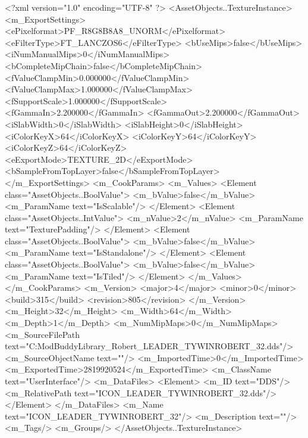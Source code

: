 <?xml version="1.0" encoding="UTF-8" ?>
<AssetObjects..TextureInstance>
	<m_ExportSettings>
		<ePixelformat>PF_R8G8B8A8_UNORM</ePixelformat>
		<eFilterType>FT_LANCZOS6</eFilterType>
		<bUseMips>false</bUseMips>
		<iNumManualMips>0</iNumManualMips>
		<bCompleteMipChain>false</bCompleteMipChain>
		<fValueClampMin>0.000000</fValueClampMin>
		<fValueClampMax>1.000000</fValueClampMax>
		<fSupportScale>1.000000</fSupportScale>
		<fGammaIn>2.200000</fGammaIn>
		<fGammaOut>2.200000</fGammaOut>
		<iSlabWidth>0</iSlabWidth>
		<iSlabHeight>0</iSlabHeight>
		<iColorKeyX>64</iColorKeyX>
		<iColorKeyY>64</iColorKeyY>
		<iColorKeyZ>64</iColorKeyZ>
		<eExportMode>TEXTURE_2D</eExportMode>
		<bSampleFromTopLayer>false</bSampleFromTopLayer>
	</m_ExportSettings>
	<m_CookParams>
		<m_Values>
			<Element class="AssetObjects..BoolValue">
				<m_bValue>false</m_bValue>
				<m_ParamName text="IsScalable"/>
			</Element>
			<Element class="AssetObjects..IntValue">
				<m_nValue>2</m_nValue>
				<m_ParamName text="TexturePadding"/>
			</Element>
			<Element class="AssetObjects..BoolValue">
				<m_bValue>false</m_bValue>
				<m_ParamName text="IsStandalone"/>
			</Element>
			<Element class="AssetObjects..BoolValue">
				<m_bValue>false</m_bValue>
				<m_ParamName text="IsTiled"/>
			</Element>
		</m_Values>
	</m_CookParams>
	<m_Version>
		<major>4</major>
		<minor>0</minor>
		<build>315</build>
		<revision>805</revision>
	</m_Version>
	<m_Height>32</m_Height>
	<m_Width>64</m_Width>
	<m_Depth>1</m_Depth>
	<m_NumMipMaps>0</m_NumMipMaps>
	<m_SourceFilePath text="C:\Users\Furion\Documents\Firaxis ModBuddy\ArtDef Library\Tywin_Robert\ICON_LEADER_TYWINROBERT_32.dds"/>
	<m_SourceObjectName text=""/>
	<m_ImportedTime>0</m_ImportedTime>
	<m_ExportedTime>2819920524</m_ExportedTime>
	<m_ClassName text="UserInterface"/>
	<m_DataFiles>
		<Element>
			<m_ID text="DDS"/>
			<m_RelativePath text="ICON_LEADER_TYWINROBERT_32.dds"/>
		</Element>
	</m_DataFiles>
	<m_Name text="ICON_LEADER_TYWINROBERT_32"/>
	<m_Description text=""/>
	<m_Tags/>
	<m_Groups/>
</AssetObjects..TextureInstance>

